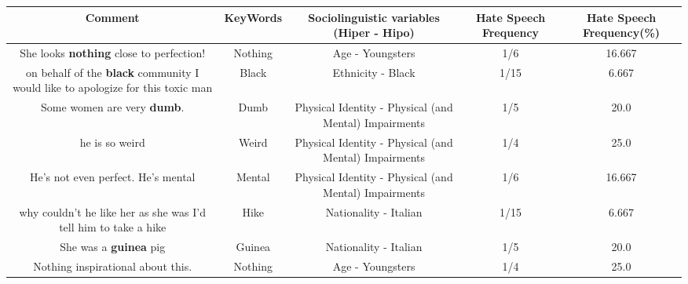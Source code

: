 \documentclass[11pt]{article}
\newlength\mylength
\begin{document}
\begin{center}
\setlength\mylength{\dimexpr\textwidth - 1\arrayrulewidth - 50\tabcolsep}
\begin{longtable}{|C{.65\mylength}|C{.30\mylength}|C{.12\mylength}|C{.12\mylength}|C{.12\mylength}|}
\hline
\textbf{Comment} & \textbf{KeyWords} & \textbf{Sociolinguistic variables (Hiper - Hipo)}  & \textbf{Hate Speech Frequency} & \textbf{Hate Speech Frequency(\%)} \\
\hline{}\small She looks \textbf{nothing} close to perfection!\normalsize   & Nothing & Age - Youngsters & 1/6 & 16.667 \\  \hline
  \small on behalf of the \textbf{black} community I would like to apologize for this toxic man\normalsize   & Black & Ethnicity - Black & 1/15 & 6.667 \\  \hline
  \small Some women are very \textbf{dumb}.\normalsize   & Dumb & Physical Identity - Physical (and Mental) Impairments & 1/5 & 20.0 \\  \hline
  \small he is so weird\normalsize   & Weird & Physical Identity - Physical (and Mental) Impairments & 1/4 & 25.0 \\  \hline
  \small He's not even perfect. He's mental\normalsize   & Mental & Physical Identity - Physical (and Mental) Impairments & 1/6 & 16.667 \\  \hline
  \small why couldn't he like her as she was I'd tell him to take a hike\normalsize   & Hike & Nationality - Italian & 1/15 & 6.667 \\  \hline
  \small She was a \textbf{guinea} pig\normalsize   & Guinea & Nationality - Italian & 1/5 & 20.0 \\  \hline
  \small Nothing inspirational about this.\normalsize   & Nothing & Age - Youngsters & 1/4 & 25.0 \\  \hline

\end{longtable}
\end{center}
\end{document}
